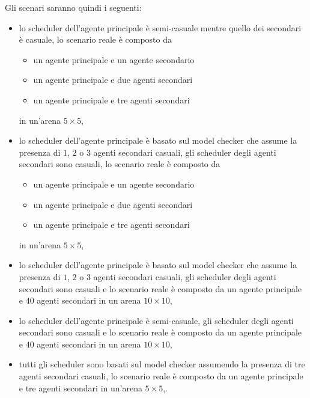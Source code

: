 Gli scenari saranno quindi i seguenti:
\begin{itemize}
	\item lo scheduler dell'agente principale è semi-casuale mentre quello dei secondari è casuale, lo scenario reale è composto da
	\begin{itemize}
		\item un agente principale e un agente secondario
		\item un agente principale e due agenti secondari
		\item un agente principale e tre agenti secondari
	\end{itemize}
	in un'arena $5\times 5$,
	\item lo scheduler dell'agente principale è basato sul model checker che assume la presenza di $1$, $2$ o $3$ agenti secondari casuali, gli scheduler degli agenti secondari sono casuali, lo scenario reale è composto da
	\begin{itemize}
		\item un agente principale e un agente secondario
		\item un agente principale e due agenti secondari
		\item un agente principale e tre agenti secondari
	\end{itemize}
	in un'arena $5\times 5$,
	\item lo scheduler dell'agente principale è basato sul model checker che assume la presenza di $1$, $2$ o $3$ agenti secondari casuali, gli scheduler degli agenti secondari sono casuali e lo scenario reale è composto da un agente principale e $40$ agenti secondari in un arena $10\times 10$,
	\item lo scheduler dell'agente principale è semi-casuale, gli scheduler degli agenti secondari sono casuali e lo scenario reale è composto da un agente principale e $40$ agenti secondari in un arena $10\times 10$,
	\item tutti gli scheduler sono basati sul model checker assumendo la presenza di tre agenti secondari casuali, lo scenario reale è composto da un agente principale e tre agenti secondari in un'arena $5\times 5$,.
\end{itemize}


